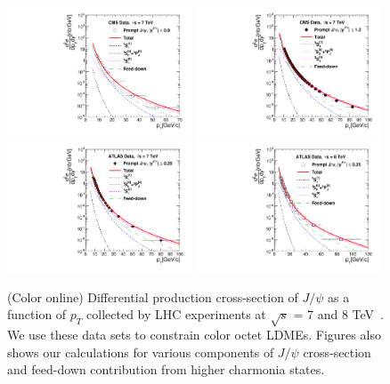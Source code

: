 \documentclass[aps,prc,preprint,superscriptaddress,showpacs,showkeys,amsmath]{revtex4-1}
\begin{document}
\begin{figure}
\includegraphics[width=0.49\textwidth]{Figures/JPsi/CMS_New_D2NDPtDy_PromptJPsi_Y0009_Pt.pdf}
\includegraphics[width=0.49\textwidth]{Figures/JPsi/CMS_Latest_D2NDPtDy_PromptJPsi_Y0012_Pt.pdf}
\includegraphics[width=0.49\textwidth]{Figures/JPsi/ATLAS_7TeV_D2NDPtDy_PromptJPsi_Y0025_Pt.pdf}
\includegraphics[width=0.49\textwidth]{Figures/JPsi/ATLAS_8TeV_D2NDPtDy_PromptJPsi_Y0025_Pt.pdf}
\caption{(Color online) Differential production cross-section of $J/\psi$ 
as a function of $p_{T}$ collected by LHC experiments at $\sqrt{s}$ = 7 and 
8 TeV~\cite{Chatrchyan:2011kc,Khachatryan:2015rra,Aad:2015duc}. 
We use these data sets to constrain color octet LDMEs. Figures also shows 
our calculations for various components of $J/\psi$ cross-section and feed-down 
contribution from higher charmonia states.}
\label{Fig:LDMEJPsi}
\end{figure}
\end{document}
